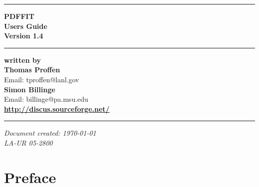 \documentclass[11pt]{report}
\newcommand{\version}{1.4}
\begin{document}

\begin{titlepage}
\begin{flushright}

  \hrule
  \vspace{15mm}
  \textbf{{ PDFFIT}} \\
  \vspace{15mm}
  \textbf{{ Users Guide}} \\
  \vspace{10mm}
  \textbf{{\Huge Version  \version}} \\
  \vspace{10mm}

  \hrule
  \vspace{35mm}
  \textbf{written by} \\

  \vspace{5mm}
  \textbf{\Large Thomas Proffen} \\
  Email: tproffen@lanl.gov \\

  \vspace{ 2mm}
  \textbf{\Large Simon Billinge} \\
  Email: billinge@pa.msu.edu \\

  \vspace{12mm}
  \textbf{\Large \url{http://discus.sourceforge.net/}} \\

  \vspace{3mm}
  \hrule

\end{flushright}
\begin{flushright}
  \textit{Document created: \today \\ LA-UR 05-2800}
\end{flushright}

\end{titlepage}


\chapter*{Preface}
\end{document}
